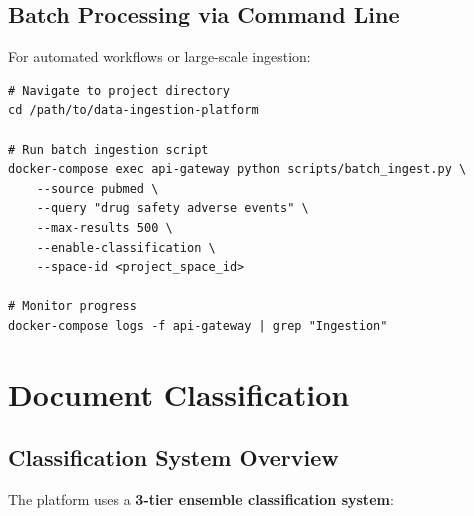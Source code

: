 \subsection{Batch Processing via Command Line}

For automated workflows or large-scale ingestion:

\begin{commandbox}
\begin{lstlisting}[style=bashstyle]
# Navigate to project directory
cd /path/to/data-ingestion-platform

# Run batch ingestion script
docker-compose exec api-gateway python scripts/batch_ingest.py \
    --source pubmed \
    --query "drug safety adverse events" \
    --max-results 500 \
    --enable-classification \
    --space-id <project_space_id>

# Monitor progress
docker-compose logs -f api-gateway | grep "Ingestion"
\end{lstlisting}
\end{commandbox}

\section{Document Classification}

\subsection{Classification System Overview}

The platform uses a \textbf{3-tier ensemble classification system}:

